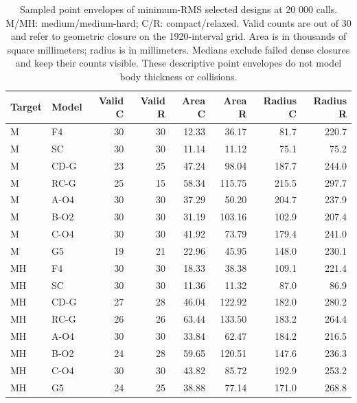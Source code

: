 \begin{table}[H]
\caption{Sampled point envelopes of minimum-RMS selected designs at 20 000 calls. M/MH: medium/medium-hard; C/R: compact/relaxed. Valid counts are out of 30 and refer to geometric closure on the 1920-interval grid. Area is in thousands of square millimeters; radius is in millimeters. Medians exclude failed dense closures and keep their counts visible. These descriptive point envelopes do not model body thickness or collisions.}
\label{tab:v3_envelopes}
\centering
\small
\begin{tabular}{@{}llrrrrrr@{}}
\toprule
Target & Model & Valid C & Valid R & Area C & Area R & Radius C & Radius R \\
\midrule
M & F4 & 30 & 30 & 12.33 & 36.17 & 81.7 & 220.7 \\
M & SC & 30 & 30 & 11.14 & 11.12 & 75.1 & 75.2 \\
M & CD-G & 23 & 25 & 47.24 & 98.04 & 187.7 & 244.0 \\
M & RC-G & 25 & 15 & 58.34 & 115.75 & 215.5 & 297.7 \\
M & A-O4 & 30 & 30 & 37.29 & 50.20 & 204.7 & 237.9 \\
M & B-O2 & 30 & 30 & 31.19 & 103.16 & 102.9 & 207.4 \\
M & C-O4 & 30 & 30 & 41.92 & 73.79 & 179.4 & 241.0 \\
M & G5 & 19 & 21 & 22.96 & 45.95 & 148.0 & 230.1 \\
MH & F4 & 30 & 30 & 18.33 & 38.38 & 109.1 & 221.4 \\
MH & SC & 30 & 30 & 11.36 & 11.32 & 87.0 & 86.9 \\
MH & CD-G & 27 & 28 & 46.04 & 122.92 & 182.0 & 280.2 \\
MH & RC-G & 26 & 26 & 63.44 & 133.50 & 183.2 & 264.4 \\
MH & A-O4 & 30 & 30 & 33.84 & 62.47 & 184.2 & 216.5 \\
MH & B-O2 & 24 & 28 & 59.65 & 120.51 & 147.6 & 236.3 \\
MH & C-O4 & 30 & 30 & 43.82 & 85.72 & 192.9 & 253.2 \\
MH & G5 & 24 & 25 & 38.88 & 77.14 & 171.0 & 268.8 \\
\bottomrule
\end{tabular}
\end{table}
